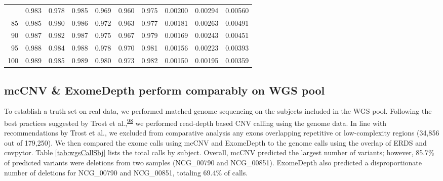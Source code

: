 \documentclass[11pt,letterpaper,oneside]{book}
\begin{document}
\begin{table}
\begin{tabular}[t]{rrrrrrrrrr}
\addlinespace
80 & 0.983 & 0.978 & 0.985 & 0.969 & 0.960 & 0.975 & 0.00200 & 0.00294 & 0.00560\\
85 & 0.985 & 0.980 & 0.986 & 0.972 & 0.963 & 0.977 & 0.00181 & 0.00263 & 0.00491\\
90 & 0.987 & 0.982 & 0.987 & 0.975 & 0.967 & 0.979 & 0.00169 & 0.00243 & 0.00451\\
95 & 0.988 & 0.984 & 0.988 & 0.978 & 0.970 & 0.981 & 0.00156 & 0.00223 & 0.00393\\
100 & 0.989 & 0.985 & 0.989 & 0.980 & 0.973 & 0.982 & 0.00150 & 0.00195 & 0.00359\\
\bottomrule
\end{tabular}
\end{table}

\hypertarget{mccnv-exomedepth-perform-comparably-on-wgs-pool}{%
\subsection{mcCNV \& ExomeDepth perform comparably on WGS pool}\label{mccnv-exomedepth-perform-comparably-on-wgs-pool}}

To establish a truth set on real data, we performed matched genome sequencing on the subjects included in the WGS pool.
Following the best practices suggested by Trost et al.,\textsuperscript{\protect\hyperlink{ref-trost:2018aa}{98}} we performed read-depth based CNV calling using the genome data.
In line with recommendations by Trost et al., we excluded from comparative analysis any exons overlapping repetitive or low-complexity regions (34,856 out of 179,250).
We then compared the exome calls using mcCNV and ExomeDepth to the genome calls using the overlap of ERDS and cnvpytor.
Table \ref{tab:wgsCallSbj} lists the total calls by subject.
Overall, mcCNV predicted the largest number of variants; however, 85.7\% of predicted variants were deletions from two samples (NCG\_00790 and NCG\_00851).
ExomeDepth also predicted a disproportionate number of deletions for NCG\_00790 and NCG\_00851, totaling 69.4\% of calls.
\end{document}
